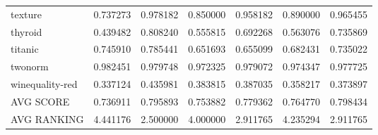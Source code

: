 \begin{tabular}{lrrrrrr}
texture         &         0.737273 &  0.978182 &                  0.850000 &       0.958182 &                  0.890000 &       0.965455 \\
thyroid         &         0.439482 &  0.808240 &                  0.555815 &       0.692268 &                  0.563076 &       0.735869 \\
titanic         &         0.745910 &  0.785441 &                  0.651693 &       0.655099 &                  0.682431 &       0.735022 \\
twonorm         &         0.982451 &  0.979748 &                  0.972325 &       0.979072 &                  0.974347 &       0.977725 \\
winequality-red &         0.337124 &  0.435981 &                  0.383815 &       0.387035 &                  0.358217 &       0.373897 \\
AVG SCORE       &         0.736911 &  0.795893 &                  0.753882 &       0.779362 &                  0.764770 &       0.798434 \\
AVG RANKING     &         4.441176 &  2.500000 &                  4.000000 &       2.911765 &                  4.235294 &       2.911765 \\
\bottomrule
\end{tabular}
